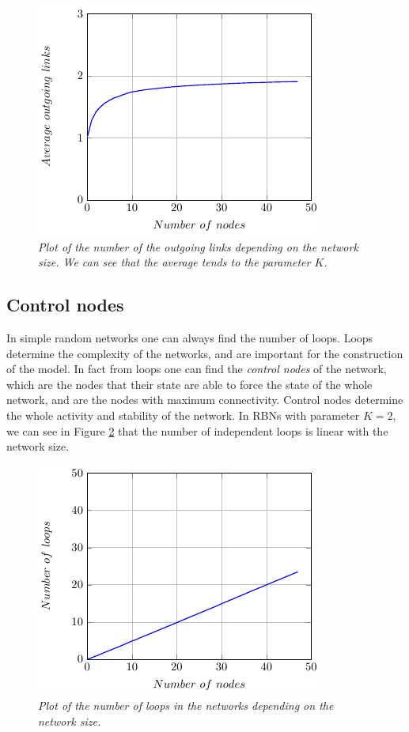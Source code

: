 \begin{figure}[h]
\centering
\includegraphics[scale=1.5]{images/outgoing.pdf}
\caption{\emph{Plot of the number of the outgoing links depending on the network size. We can see that the average tends to the parameter $K$. }}
\label{fig:outgoing}
\end{figure}



\subsection{Control nodes}
In simple random networks one can always find the number of loops.
Loops determine the complexity of the networks\cite{K38}, and are important for the construction of the model. In fact from loops one can find the \emph{control nodes} of the network, which are the nodes that their state are able to force the state of the whole network, and are the nodes with maximum connectivity. Control nodes determine the whole activity and stability of the network. 
In RBNs with parameter $K=2$, we can see in Figure \ref{fig:loops} that the number of independent loops is linear with the network size.
\begin{figure}[h]
\centering
\includegraphics[scale=1.5]{images/loops.pdf}
\caption{\emph{Plot of the number of loops in the networks depending on the network size.}}
\label{fig:loops}
\end{figure}


